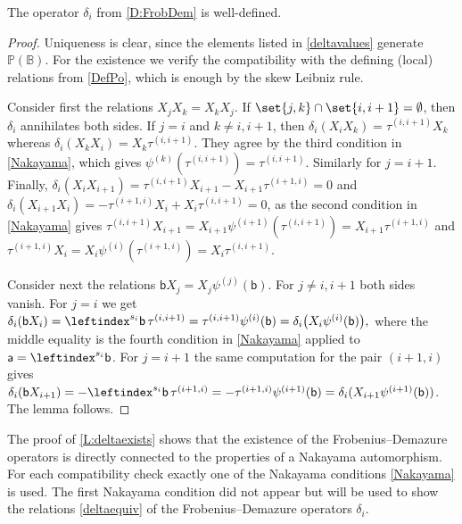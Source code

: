 \documentclass[a4paper,11pt]{amsart}
\numberwithin{equation}{subsection}
\theoremstyle{definition}
\theoremstyle{theorem}
\theoremstyle{remark}
\newcommand\ba{\mathsf{a}}
\newcommand\bb{\mathsf{b}}
\newcommand\Po{\mathbb{P}(\mathbb{B})}
\begin{document}
\begin{Lemma}\label{L:deltaexists}
  The operator $\delta_i$ from \autoref{D:FrobDem} is well-defined.
\end{Lemma}

\begin{proof}
  Uniqueness is clear, since the elements listed in \autoref{deltavalues}
  generate $\Po$. For the existence we verify the compatibility with the
  defining (local) relations from \autoref{DefPo}, which is enough by the skew Leibniz rule.

  Consider first the relations $X_jX_k=X_kX_j$. If
  $\set{j,k}\cap\set{i,i+1}=\emptyset$, then $\delta_i$ annihilates both sides. If
  $j=i$ and $k\not=i,i+1$, then $\delta_i(X_iX_k)=\tau^{(i,i+1)}X_k$
  whereas $\delta_i(X_kX_i)=X_k\tau^{(i,i+1)}$. They agree by the
  third condition in \autoref{Nakayama}, which gives
  $\psi^{(k)}(\tau^{(i,i+1)})=\tau^{(i,i+1)}$. Similarly for $j=i+1$. Finally,
   $ \delta_i(X_iX_{i+1})=\tau^{(i,i+1)}X_{i+1}-X_{i+1}\tau^{(i+1,i)}=0$ and
    $\delta_i(X_{i+1}X_i)=-\tau^{(i+1,i)}X_i+X_i\tau^{(i,i+1)}=0$, as the second condition in \autoref{Nakayama} gives
  $\tau^{(i,i+1)}X_{i+1}=X_{i+1}\psi^{(i+1)}(\tau^{(i,i+1)})=X_{i+1}\tau^{(i+1,i)}$
  and $\tau^{(i+1,i)}X_{i}=X_{i}\psi^{(i)}(\tau^{(i+1,i)})=X_{i}\tau^{(i,i+1)}$.

  Consider next the relations $\bb X_j=X_j\psi^{(j)}(\bb)$. For
  $j\not=i,i+1$ both sides vanish. For $j=i$ we get
  $  \delta_i(\bb X_i)=\leftindex^{s_i}\bb\,\tau^{(i,i+1)}
      =\tau^{(i,i+1)}\psi^{(i)}(\bb)
      =\delta_i\bigl(X_i\psi^{(i)}(\bb)\bigr),$
  where the middle equality is  the fourth
  condition in \autoref{Nakayama} applied to
  $\ba=\leftindex^{s_i}\bb$. For $j=i+1$ the same computation for the  pair $(i+1,i)$ gives
  $\delta_i(\bb X_{i+1})=-\leftindex^{s_i}\bb\,\tau^{(i+1,i)}
   =-\tau^{(i+1,i)}\psi^{(i+1)}(\bb)=\delta_i(X_{i+1}\psi^{(i+1)}(\bb))$.
  The lemma follows.
\end{proof}

\begin{Remark}
The proof of \autoref{L:deltaexists} shows that the existence of the Frobenius--Demazure operators is directly connected to the properties of a Nakayama automorphism.  For each compatibility check exactly one of the Nakayama conditions \autoref{Nakayama} is used. The first Nakayama condition did not appear but will be used to show the  relations \autoref{deltaequiv} of the Frobenius--Demazure operators $\delta_i$.
\end{Remark}
\end{document}
